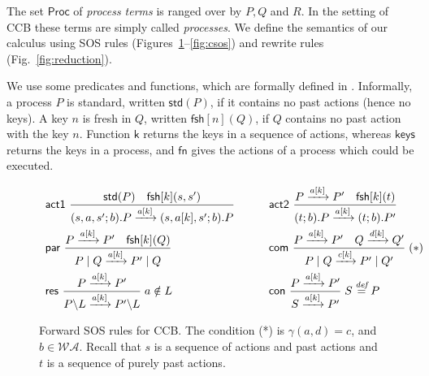 \documentclass[runningheads]{llncs}
\newcommand{\Rule}[2]{\displaystyle{\frac{#1}{#2}}}
\newcommand{\Proc}{\mathsf{Proc}}
\newcommand{\paral}{\; \vert \;}
\newcommand{\std}[1]{\mathsf{std}(#1)}
\newcommand{\freshpred}[1]{\mathsf{fsh}[#1]}
\newcommand{\fresh}[2]{\mathsf{fsh}[#1](#2)}
\newcommand{\bydef}{\stackrel{\emph{def}}{=}}
\newcommand{\rulename}[1]{\textsf{#1}}
\begin{document}
The set $\Proc$ of \emph{process terms} is ranged over by $P,Q$ and $R$. 
In the setting of CCB these terms are simply called \emph{processes}. We define the semantics of our calculus using SOS rules (Figures~\ref{fig:fsos}--\ref{fig:csos}) and rewrite rules (Fig.~\ref{fig:reduction}).

We use some predicates and functions, which are formally defined in \cite{KUHN201818}. Informally, a process $P$ is standard, written $\std{P}$, if it contains no past actions (hence no keys). A key $n$ is fresh in $Q$, written $\freshpred{n}(Q)$, if $Q$ contains no past action with the key $n$. Function $\mathsf{k}$ returns the keys in a sequence of actions, 
whereas $\mathsf{keys}$ returns the keys in a process, and $\mathsf{fn}$ gives the actions of a process 
which could be executed.


\begin{figure}
\vspace{-4ex}\[
\begin{array}{ll}
\rulename{act1}\ 
\Rule
{\std{P} \quad \fresh{k}{s,s'}}
{(s,a,s';b).P \xrightarrow{a[k]}(s,a[k],s';b).P}
\qquad &
\rulename{act2}\
\Rule
{P \xrightarrow{a[k]} P' \quad \fresh{k}{t}}
{(t;b).P \xrightarrow{a[k]} (t;b).P'}
\\[15pt]
\rulename{par}\
\Rule
{P \xrightarrow{a[k]} P'\quad \fresh{k}{Q}}
{P \paral Q \xrightarrow{a[k]} P' \paral Q}
\qquad &
\rulename{com}\
\Rule
{P \xrightarrow{a[k]} P' \quad Q \xrightarrow{d[k]} Q'}
{P \paral Q \xrightarrow{c[k]} P' \paral Q'}
\; (*)
%
\\[15pt]
\rulename{res}\
\Rule
{P \xrightarrow{a[k]} P'}
{P\backslash L \xrightarrow{a[k]} P'\backslash L}
\; a \notin L
\qquad &
\rulename{con}\
\Rule
{P \xrightarrow{a[k]} P'}
{S \xrightarrow{a[k]} P'}
\; S \bydef P
\end{array}
\] 
\vspace{-3ex}\caption[Forward SOS rules for CCB.]{Forward SOS rules for CCB. 
The condition (*) is $\gamma(a,d)=c$, and $b \in \mathcal{WA}$. Recall that $s$ is a sequence 
of actions and past actions and $t$ is a sequence of purely past actions.} \label{fig:fsos}
\vspace{-2ex}\end{figure}
\end{document}
